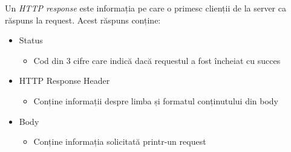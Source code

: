 Un {\it HTTP response} este informația pe care o primesc clienții de la server ca răspuns la request. Acest răspuns conține:
\begin{itemize}
	\setlength\itemsep{0.5em}
    \item Status
    \begin{itemize}
		\setlength\itemsep{0.5em}
        \item Cod din 3 cifre care indică dacă requestul a fost încheiat cu succes
    \end{itemize}
    \item HTTP Response Header
    \begin{itemize}
		\setlength\itemsep{0.5em}
        \item Conține informații despre limba și formatul conținutului din body
    \end{itemize}
    \item Body
    \begin{itemize}
		\setlength\itemsep{0.5em}
        \item Conține informația solicitată printr-un request
    \end{itemize}
\end{itemize}

